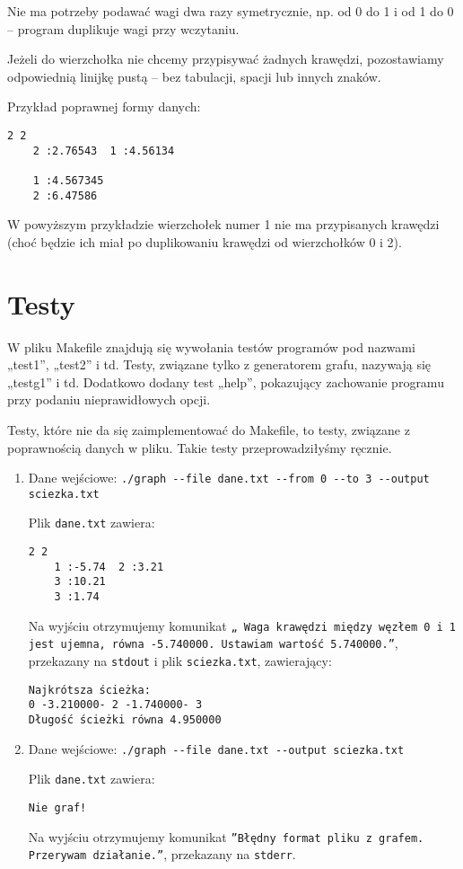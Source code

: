 \documentclass[]{article}
\begin{document}
Nie ma potrzeby podawać wagi dwa razy symetrycznie, np. od 0 do 1 i od 1 do 0 – program duplikuje wagi przy wczytaniu.

Jeżeli do wierzchołka nie chcemy przypisywać żadnych krawędzi, pozostawiamy odpowiednią linijkę pustą – bez tabulacji, spacji lub innych znaków.

Przykład poprawnej formy danych:
\begin{verbatim}
2 2
    2 :2.76543  1 :4.56134

    1 :4.567345
    2 :6.47586
\end{verbatim}
W powyższym przykładzie wierzchołek numer 1 nie ma przypisanych krawędzi (choć będzie ich miał po duplikowaniu krawędzi od wierzchołków 0 i 2).
\section{Testy}\label{header-n233}

W pliku Makefile znajdują się wywołania testów programów pod nazwami „test1”, „test2” i td. Testy, związane tylko z generatorem grafu, nazywają się „testg1” i td. Dodatkowo dodany test „help”, pokazujący zachowanie programu przy podaniu nieprawidłowych opcji.

Testy, które nie da się zaimplementować do Makefile, to testy, związane z poprawnością danych w pliku. Takie testy przeprowadziłyśmy ręcznie.

\begin{enumerate}
    \item Dane wejściowe: \texttt{./graph -{}-file dane.txt -{}-from 0 -{}-to 3 -{}-output sciezka.txt}
    
Plik \texttt{dane.txt} zawiera:
\begin{verbatim}
2 2
    1 :-5.74  2 :3.21
    3 :10.21
    3 :1.74
\end{verbatim}
Na wyjściu otrzymujemy komunikat \texttt{„ Waga krawędzi między węzłem 0 i 1 jest ujemna, równa -5.740000. Ustawiam wartość 5.740000.”}, przekazany na \texttt{stdout} i plik \texttt{sciezka.txt}, zawierający:
\begin{verbatim}
Najkrótsza ścieżka: 
0 -3.210000- 2 -1.740000- 3
Długość ścieżki równa 4.950000
\end{verbatim}
    \item Dane wejściowe: \texttt{./graph -{}-file dane.txt -{}-output sciezka.txt}

Plik \texttt{dane.txt} zawiera:
\begin{verbatim}
Nie graf!
\end{verbatim}
Na wyjściu otrzymujemy komunikat \texttt{”Błędny format pliku z grafem. Przerywam działanie.”}, przekazany na \texttt{stderr}.
\end{enumerate}
\end{document}
